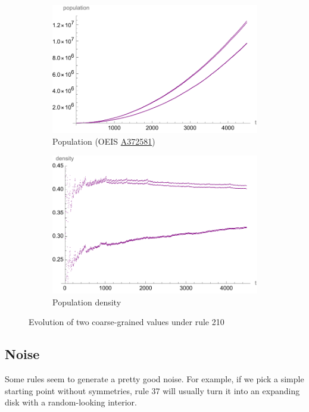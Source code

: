 \documentclass{article}
\begin{document}
\begin{figure}[H]
    \centering
    \begin{subfigure}[b]{0.51\textwidth}
        \centering
        \includegraphics[width=\textwidth]{graphics/behavior/rule-210/rule-210-population-plot.pdf}
        \caption{Population (OEIS \href{https://oeis.org/A372581}{A372581})}
    \end{subfigure}
    \begin{subfigure}[b]{0.48\textwidth}
        \centering
        \includegraphics[width=\textwidth]{graphics/behavior/rule-210/rule-210-density-plot.pdf}
        \caption{Population density}
    \end{subfigure}
       \caption{Evolution of two coarse-grained values under rule 210}
       \label{fig:rule-210-coarse-grained}
\end{figure}


\pagebreak
\subsection{Noise} \label{noise}
Some rules seem to generate a pretty good noise. For example, if we pick a simple starting point without symmetries, rule 37 will usually turn it into an expanding disk with a random-looking interior.
\end{document}
